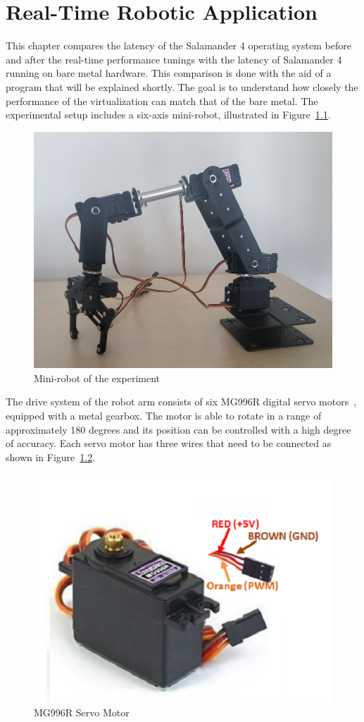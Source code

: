 \documentclass[MMR,Master,english]{twbook}
\begin{document}
\chapter{Real-Time Robotic Application}\label{cha:robotic_application}
This chapter compares the latency of the Salamander 4 operating system before and after the real-time performance tunings with the latency of Salamander 4 running on bare metal hardware. This comparison is done with the aid of a program that will be explained shortly. The goal is to understand how closely the performance of the virtualization can match that of the bare metal. The experimental setup includes a six-axis mini-robot, illustrated in Figure~\ref{fig:mini_robot}.

\begin{figure}[H]
	\centering
	\includegraphics[width=0.45\columnwidth]{img/experiment/mini_robot.jpg}
	\caption[Mini-robot of the experiment]{Mini-robot of the experiment}
	\label{fig:mini_robot}
\end{figure}

\noindent The drive system of the robot arm consists of six MG996R digital servo motors~\cite{MG996RServoMotor}, equipped with a metal gearbox. The motor is able to rotate in a range of approximately 180 degrees and its position can be controlled with a high degree of accuracy. Each servo motor has three wires that need to be connected as shown in Figure~\ref{fig:motor_wires}.

\begin{figure}[H]
	\centering
	\includegraphics[width=0.45\columnwidth]{img/experiment/motor_wires.png}
	\caption[MG996R Servo Motor]{MG996R Servo Motor~\cite{MG996RServoMotor}}
	\label{fig:motor_wires}
\end{figure}
\end{document}
